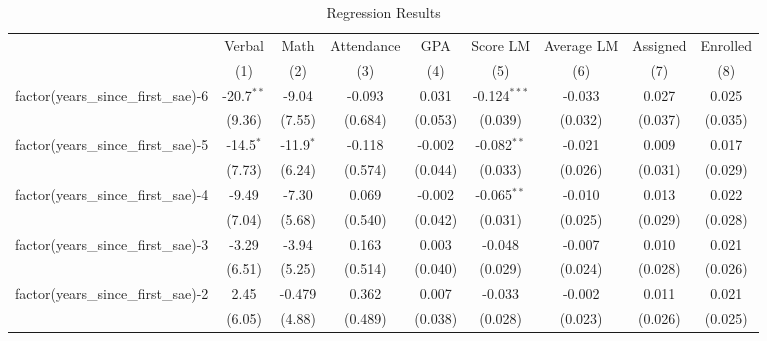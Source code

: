 \begin{table}[htbp]
   \caption{\label{tab:reg_results} Regression Results}
   \bigskip
   \centering
   \begin{tabular}{lcccccccc}
      \toprule
                                            & Verbal        & Math          & Attendance    & GPA           & Score LM       & Average LM    & Assigned      & Enrolled\\  
                                            & (1)           & (2)           & (3)           & (4)           & (5)            & (6)           & (7)           & (8)\\  
      \midrule 
      factor(years\_since\_first\_sae)-6    & -20.7$^{**}$  & -9.04         & -0.093        & 0.031         & -0.124$^{***}$ & -0.033        & 0.027         & 0.025\\   
                                            & (9.36)        & (7.55)        & (0.684)       & (0.053)       & (0.039)        & (0.032)       & (0.037)       & (0.035)\\   
      factor(years\_since\_first\_sae)-5    & -14.5$^{*}$   & -11.9$^{*}$   & -0.118        & -0.002        & -0.082$^{**}$  & -0.021        & 0.009         & 0.017\\   
                                            & (7.73)        & (6.24)        & (0.574)       & (0.044)       & (0.033)        & (0.026)       & (0.031)       & (0.029)\\   
      factor(years\_since\_first\_sae)-4    & -9.49         & -7.30         & 0.069         & -0.002        & -0.065$^{**}$  & -0.010        & 0.013         & 0.022\\   
                                            & (7.04)        & (5.68)        & (0.540)       & (0.042)       & (0.031)        & (0.025)       & (0.029)       & (0.028)\\   
      factor(years\_since\_first\_sae)-3    & -3.29         & -3.94         & 0.163         & 0.003         & -0.048         & -0.007        & 0.010         & 0.021\\   
                                            & (6.51)        & (5.25)        & (0.514)       & (0.040)       & (0.029)        & (0.024)       & (0.028)       & (0.026)\\   
      factor(years\_since\_first\_sae)-2    & 2.45          & -0.479        & 0.362         & 0.007         & -0.033         & -0.002        & 0.011         & 0.021\\   
                                            & (6.05)        & (4.88)        & (0.489)       & (0.038)       & (0.028)        & (0.023)       & (0.026)       & (0.025)\\   

\end{tabular}
\end{table}

